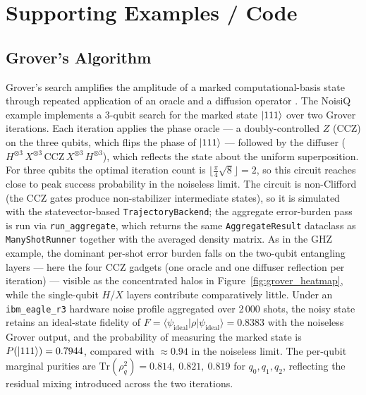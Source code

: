 \documentclass[10pt,twocolumn]{article}
\begin{document}
\section*{Supporting Examples / Code}
\label{sec:supporting_code}


\subsection*{Grover's Algorithm}
\label{subsec:grovers}
Grover's search amplifies the amplitude of a marked computational-basis
state through repeated application of an oracle and a diffusion operator
\cite{grover1996fast}. The NoisiQ example implements a 3-qubit search for
the marked state $\ket{111}$ over two Grover iterations. Each iteration
applies the phase oracle --- a doubly-controlled $Z$ (CCZ) on the three
qubits, which flips the phase of $\ket{111}$ --- followed by the diffuser
($H^{\otimes 3} \, X^{\otimes 3} \, \text{CCZ} \, X^{\otimes 3} \,
H^{\otimes 3}$), which reflects the state about the uniform superposition.
For three qubits the optimal iteration count is
$\lfloor \tfrac{\pi}{4}\sqrt{8} \rfloor = 2$, so this circuit reaches close
to peak success probability in the noiseless limit.
The circuit is non-Clifford (the CCZ gates produce non-stabilizer
intermediate states), so it is simulated with the statevector-based
\texttt{TrajectoryBackend}; the aggregate error-burden pass is run via
\texttt{run\_aggregate}, which returns the same \texttt{AggregateResult}
dataclass as \texttt{ManyShotRunner} together with the averaged density
matrix. As in the GHZ example, the dominant per-shot error burden falls on
the two-qubit entangling layers --- here the four CCZ gadgets (one oracle
and one diffuser reflection per iteration) --- visible as the concentrated
halos in Figure~\ref{fig:grover_heatmap}, while the single-qubit
$H$/$X$ layers contribute comparatively little.
Under an \texttt{ibm\_eagle\_r3} hardware noise profile aggregated over
2\,000 shots, the noisy state retains an ideal-state fidelity of
$F = \langle \psi_{\text{ideal}} | \rho | \psi_{\text{ideal}} \rangle
= 0.8383$ with the noiseless Grover output, and the probability of
measuring the marked state is $P(\ket{111}) = 0.7944$, compared with
$\approx 0.94$ in the noiseless limit. The per-qubit marginal purities are
$\mathrm{Tr}(\rho_{q}^2) = 0.814,\ 0.821,\ 0.819$ for $q_0, q_1, q_2$,
reflecting the residual mixing introduced across the two iterations.
\end{document}
